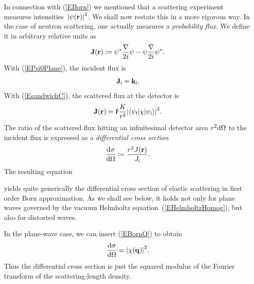In connection with (\ref{EBorn}) we mentioned
that a scattering experiment measures intensities~${|\psi(\mathbf{r})|}^2$.
We shall now restate this in a more rigorous way.
In the case of neutron scattering,
one actually measures a \textit{probability flux}.
We define it in arbitrary relative units as
\begin{equation}\label{EdefJ}
  \mathbf{J}(\mathbf{r}) \coloneqq  \psi^*\frac{\mathbf{\nabla}}{2i}\psi - \psi\frac{\mathbf{\nabla}}{2i}\psi^*.
\end{equation}
%
With (\ref{EPsi0Plane}), the incident flux is
\begin{equation}
  \mathbf{J}_{\text{i}} = \mathbf{k}_{\text{i}}.
\end{equation}
With (\ref{EsandwichC}), the scattered flux at the detector is
\begin{equation}\label{EJr}
  \mathbf{J}(\mathbf{r})
  = \mathbf{\hat r}\frac{K}{r^2}
    {\left|\left\langle\psi_{\text{f}}|\chi|\psi_{\text{i}}\right\rangle\right|}^2.
\end{equation}
The ratio of the scattered flux hitting an infinitesimal detector area
$r^2\text{d}\Omega$ to the incident flux is expressed as a
\textit{differential cross section}
%
\begin{equation}
  \frac{\text{d}\sigma}{\text{d}\Omega}
  \coloneqq  \frac{r^2 J(\mathbf{r})}{J_{\text{i}}}.
\end{equation}
%
%
The resulting equation

yields quite generically the differential cross section of elastic scattering
in first order Born approximation.
As we shall see below,
it holds not only for plane waves governed
by the vacuum Helmholtz equation~(\ref{EHelmholtzHomog}),
but also for distorted waves.

In the plane-wave case, we can insert (\ref{EBornQ}) to obtain
\begin{equation}\label{Ecross1}
  \frac{\text{d}\sigma}{\text{d}\Omega}
  = {\left| \chi(\mathbf{q}) \right|}^2.
\end{equation}
Thus the differential cross section is just the squared modulus
of the Fourier transform 
%
of the scattering-length density.


